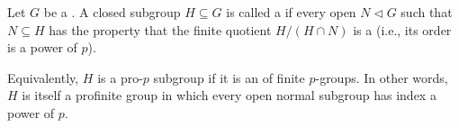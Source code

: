 \begin{definition} \label{definition:pro_p_subgroup_of_a_topological_group}
Let $G$ be a . A closed subgroup $H \subseteq G$ is called a  if every open  $N \triangleleft G$ such that $N \subseteq H$ has the property that the finite quotient $H/(H \cap N)$ is a  (i.e., its order is a power of $p$).

Equivalently, $H$ is a pro-$p$ subgroup if it is an  of finite $p$-groups. In other words, $H$ is itself a profinite group in which every open normal subgroup has index a power of $p$.
\end{definition}
